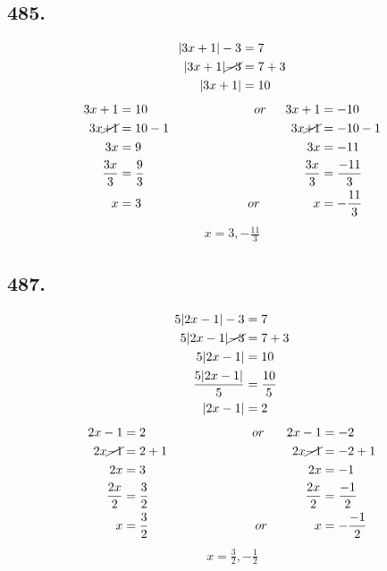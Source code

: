 \documentclass{article}
\begin{document}
    \subsection*{485.}
    \begin{align*}
        |3x + 1| - 3 &= 7\\
        |3x + 1| \cancel{- 3} &= 7 + 3\\
        |3x + 1| &= 10\\
    \end{align*}
    \begin{align*}
        3x + 1 &= 10 \hspace{3cm}or\hspace{.2cm} &3x + 1 &= -10 \\
        3x \cancel{+ 1} &= 10 - 1  &3x \cancel{+ 1} &= -10 - 1 \\
        3x &= 9 &3x &= -11 \\
        \frac{3x}{3} &= \frac{9}{3} &\frac{3x}{3} &= \frac{-11}{3} \\
        x &= 3 \hspace{3cm}or\hspace{.2cm} &x &= -\frac{11}{3} \\
    \end{align*}
    \begin{align*}
        \boxed{x = 3, -\frac{11}{3}}
    \end{align*}

    \subsection*{487.}
    \begin{align*}
        5|2x - 1| - 3 &= 7\\
        5|2x - 1| \cancel{- 3} &= 7 + 3\\
        5|2x - 1| &= 10\\
        \frac{5|2x - 1|}{5} &= \frac{10}{5}\\
        |2x - 1| &= 2\\
    \end{align*}
    \begin{align*}
        2x - 1 &= 2 \hspace{3cm}or\hspace{.2cm} &2x - 1 &= -2 \\
        2x \cancel{- 1} &= 2 + 1  &2x \cancel{- 1} &= -2 +1 \\
        2x &= 3 &2x &= -1 \\
        \frac{2x}{2} &= \frac{3}{2} &\frac{2x}{2} &= \frac{-1}{2} \\
        x &= \frac{3}{2}  \hspace{3cm}or\hspace{.2cm} &x &= -\frac{-1}{2} \\
    \end{align*}
    \begin{align*}
        \boxed{x = \frac{3}{2} , -\frac{1}{2}}
    \end{align*}
\end{document}
